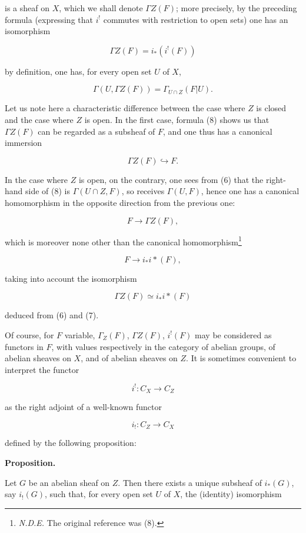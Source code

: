 \documentclass[
]{article}
\begin{document}
is a sheaf on \(X\), which we shall denote \(\Gamma Z(F)\); more
precisely, by the preceding formula (expressing that \(i^{!}\) commutes
with restriction to open sets) one has an isomorphism

\[
\Gamma Z(F) = i_{*}(i^{!}(F))
\]

by definition, one has, for every open set \(U\) of \(X\),

\[
\Gamma(U, \Gamma Z(F)) = \Gamma_{U\cap Z}(F|U).
\]

Let us note here a characteristic difference between the case where
\(Z\) is closed and the case where \(Z\) is open. In the first case,
formula (8) shows us that \(\Gamma Z(F)\) can be regarded as a subsheaf
of \(F\), and one thus has a canonical immersion

\[
\Gamma Z(F) \hookrightarrow F.
\]

In the case where \(Z\) is open, on the contrary, one sees from (6) that
the right-hand side of (8) is \(\Gamma(U \cap Z, F)\), so receives
\(\Gamma(U, F)\), hence one has a canonical homomorphism in the opposite
direction from the previous one:

\[
F \longrightarrow \Gamma Z(F),
\]

which is moreover none other than the canonical homomorphism\footnote{\emph{N.D.E.}
  The original reference was (8).}

\[
F \longrightarrow i_{*} i*(F),
\]

taking into account the isomorphism

\[
\Gamma Z(F) \simeq i_{*} i*(F)
\]

deduced from (6) and (7).

Of course, for \(F\) variable, \(\Gamma_{Z}(F)\), \(\Gamma Z(F)\),
\(i^{!}(F)\) may be considered as functors in \(F\), with values
respectively in the category of abelian groups, of abelian sheaves on
\(X\), and of abelian sheaves on \(Z\). It is sometimes convenient to
interpret the functor

\[
i^{!}: C_{X} \longrightarrow C_{Z}
\]

as the right adjoint of a well-known functor

\[
i_{!}: C_{Z} \longrightarrow C_{X}
\]

defined by the following proposition:

\textbf{Proposition.}

Let \(G\) be an abelian sheaf on \(Z\). Then there exists a unique
subsheaf of \(i_{*}(G)\), say \(i_{!}(G)\), such that, for every open
set \(U\) of \(X\), the (identity) isomorphism
\end{document}
